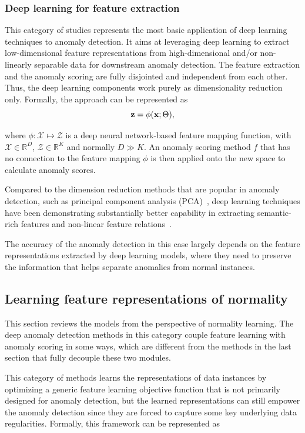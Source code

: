 \subsubsection{Deep learning for feature extraction}
This category of studies represents the most basic application of deep learning techniques to anomaly detection. It aims at leveraging deep learning to extract low-dimensional feature representations from high-dimensional and/or non-linearly separable data for downstream anomaly detection. The feature extraction and the anomaly scoring are fully disjointed and independent from each other. Thus, the deep learning components work purely as dimensionality reduction only.  Formally, the approach can be represented as
\begin{equation}\label{eqn:featureextraction}
\centering
    \mathbf{z} = \phi(\mathbf{x}; \Theta),
\end{equation}

where $\phi:\mathcal{X} \mapsto \mathcal{Z}$ is a deep neural network-based feature mapping function, with $\mathcal{X}\in \mathbb{R}^{D}$, $\mathcal{Z} \in \mathbb{R}^{K}$ and normally $D \gg K$. An anomaly scoring method $f$ that has no connection to the feature mapping $\phi$ is then applied onto the new space to calculate anomaly scores.

Compared to the dimension reduction methods that are popular in anomaly detection, such as principal component analysis (PCA)~\cite{jolliffe2016principal}, deep learning techniques have been demonstrating substantially better capability in extracting semantic-rich features and non-linear feature relations~\cite{bengio2013representation,Goodfellow-et-al-2016}.

The accuracy of the anomaly detection in this case largely depends on the feature representations extracted by deep learning models, where they need to preserve the information that helps separate anomalies from normal instances.

\subsection{Learning feature representations of normality}
This section reviews the models from the perspective of normality learning. The deep anomaly detection methods in this category couple feature learning with anomaly scoring in some ways, which are different from the methods in the last section that fully decouple these two modules. 

This category of methods learns the representations of data instances by optimizing a generic feature learning objective function that is not primarily designed for anomaly detection, but the learned representations can still empower the anomaly detection since they are forced to capture some key underlying data regularities. Formally, this framework can be represented as

